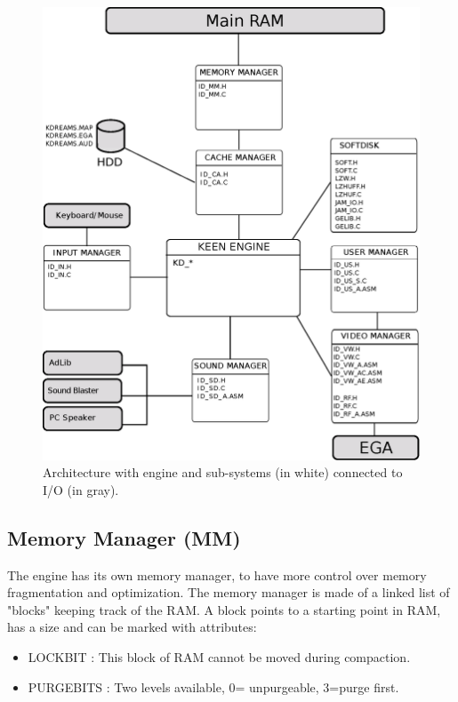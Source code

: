 \documentclass[book.tex]{subfiles}
\begin{document}
\begin{figure}[H] 
\centering
\includegraphics[width=\textwidth]{imgs/drawings/architecture.eps}
\caption{Architecture with engine and sub-systems (in white) connected to I/O (in gray).}
\label{fig:architecture}
\end{figure}




\subsection{Memory Manager (MM)}
The engine has its own memory manager, to have more control over memory fragmentation and optimization. The memory manager is made of a linked list of "blocks" keeping track of the RAM. A block points to a starting point in RAM, has a size and can be marked with attributes:
\begin{itemize}
  \item LOCKBIT : This block of RAM cannot be moved during compaction.
  \item PURGEBITS : Two levels available, 0= unpurgeable, 3=purge first.
\end{itemize}
\end{document}
